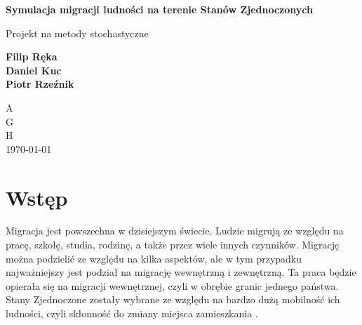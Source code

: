 \documentclass[a4paper,12pt]{article}
\begin{document}
\begin{titlepage}
    \begin{center}
        \vspace*{1cm}

        \Huge
        \textbf{Symulacja migracji ludności na terenie Stanów Zjednoczonych}

        \vspace{0.5cm}
        \LARGE
        Projekt na metody stochastyczne

        \vspace{1.5cm}

        \textbf{Filip Ręka\\ Daniel Kuc\\ Piotr Rzeźnik}

        \vfill


        \vspace{0.8cm}

        \Large
        A\\
        G\\
        H\\
        \today

    \end{center}
\end{titlepage}
\newpage
\section*{Wstęp}
Migracja jest powszechna w dzisiejszym świecie. Ludzie migrują ze względu na pracę, szkołę,
studia, rodzinę, a także przez wiele innych czynników. Migrację można podzielić ze względu na
kilka aspektów, ale w tym przypadku najważniejszy jest podział na migrację wewnętrzną i zewnętrzną.
Ta praca będzie opierała się na migracji wewnętrznej, czyli w obrębie granic jednego państwa.
Stany Zjednoczone zostały wybrane ze względu na bardzo dużą mobilność ich ludności,
czyli skłonność do zmiany miejsca zamieszkania \cite{wiki:migracja_ludnosci}.
\end{document}
